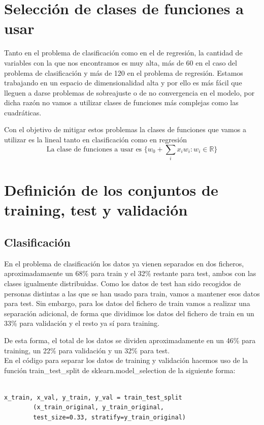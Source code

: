 \documentclass[12pt]{article}
\begin{document}
\section{Selección de clases de funciones a usar}

Tanto en el problema de clasificación como en el de regresión, la cantidad de variables con la que nos encontramos es muy alta, más de 60 en el caso del problema de clasificación y más de 120 en el problema de regresión. Estamos trabajando en un espacio de dimensionalidad alta y por ello es más fácil que lleguen a darse problemas de sobreajuste o de no convergencia en el modelo, por dicha razón no vamos a utilizar clases de funciones más complejas como las cuadráticas.

Con el objetivo de mitigar estos problemas la clases de funciones que vamos a utilizar es la lineal tanto en clasificación como en regresión
$$\text{La clase de funciones a usar es }\{w_0 + \sum_{i}x_iw_i : w_i \in \mathbb{R} \}$$

\section{Definición de los conjuntos de training, test y validación}

\subsection{Clasificación}

En el problema de clasificación los datos ya vienen separados en dos ficheros, aproximadamaente un 68\% para train y el 32\% restante para test, ambos con las clases igualmente distribuidas. Como los datos de test han sido recogidos de personas distintas a las que se han usado para train, vamos a mantener esos datos para test. Sin embargo, para los datos del fichero de train vamos a realizar una separación adicional, de forma que dividimos los datos del fichero de train en un 33\% para validación y el resto ya sí para training.

De esta forma, el total de los datos se dividen aproximadamente en un 46\% para training, un 22\% para validación y un 32\% para test.\\

En el código para separar los datos de training y validación hacemos uso de la función 
train\_test\_split de sklearn.model\_selection de la siguiente forma:

\begin{lstlisting}[frame=single]
        
x_train, x_val, y_train, y_val = train_test_split
		(x_train_original, y_train_original, 
		test_size=0.33, stratify=y_train_original)
      
\end{lstlisting}
\end{document}
